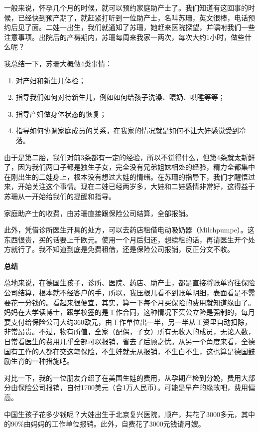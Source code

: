 \documentclass[twoside,openright,headings=optiontohead]{ctexbook} %
\providecommand{\tightlist}{%
   \setlength{\itemsep}{0pt}\setlength{\parskip}{0pt}}
\begin{document}
{一般来说，怀孕几个月的时候，就可以预约家庭助产士了。我们知道有这回事的时候，已经快到预产期了，就赶紧打听到一位助产士，名叫苏珊，英文很棒，电话预约后见了面。二娃一出生，我们就通知了苏珊，她赶来医院探望，并嘱咐我们一些注意事项。出院后的产褥期内，苏珊每周来我家一两次，每次大约1小时，做些什么呢？

我总结一下，苏珊大概做4类事情：

\begin{enumerate}
\def\labelenumi{\arabic{enumi}.}
\tightlist
\item
  对产妇和新生儿体检；
\item
  指导我们如何对待新生儿，例如如何给孩子洗澡、喂奶、哄睡等等；
\item
  指导产妇做身体状态的恢复；
\item
  指导如何协调家庭成员的关系，在我家的情况就是如何不让大娃感觉受到冷落。
\end{enumerate}

由于是第二胎，我们对前3条都有一定的经验，所以不觉得什么，但第4条就太新鲜了，因为我们两口子都是独生子女，完全没有兄弟姐妹相处的经验，精力全都集中在刚出生的二娃身上，根本没有想过大娃的情绪。在苏珊的指导下，我们才醒悟过来，开始关注这个事情。现在二娃已经两岁多，大娃和二娃感情非常好，这得益于苏珊从一开始给我们的提醒和指导。

家庭助产士的收费，由苏珊直接跟保险公司结算，全部报销。

此外，凭借诊所医生开具的处方，可以去药店租借电动吸奶器（Milchpumpe）。这东西很贵，买的话要上千欧元。使用一个月后归还，想续租的话，再请医生开个处方就行了。我不知道到底是免费租借，还是保险公司报销，反正分文不收。

\textbf{总结}

总地来说，在德国生孩子，诊所、医院、药店、助产士，都是直接将账单寄往保险公司结算，根本就不经客户的手，所以，我压根儿看不到账单明细，表面看是不需要花一分钱的。看起来很便宜，其实，算一下每个月买保险的费用就知道缘由了。妈妈在大学读博士，跟学校签的是工作合同，这种情况下买公立险是强制的，每月要支付给保险公司大约360欧元，由工作单位出一半，另一半从工资里自动扣除，非常昂贵。不过，物有所值，全家（配偶，子女）所有无收入的成员，无论人数，日常看医生的费用几乎全部可以报销，省去了后顾之忧。从另一个角度来看，全德国有工作的人都在交这笔保险，不生娃就无从报销，不生白不生，这也算是德国鼓励生育的一种措施吧。

对比一下，我的一位朋友介绍了在美国生娃的费用，从孕期产检到分娩，费用大部分由保险公司报销，自付1700美元（合1万人民币）。可能是早产的缘故吧，费用偏高。

中国生孩子花多少钱呢？大娃出生于北京复兴医院，顺产，共花了3000多元，其中的90\%由妈妈的工作单位报销。此外，自费花了3000元钱请月嫂。

}
\end{document}
